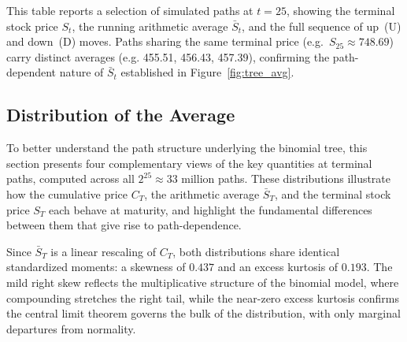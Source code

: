 \documentclass[hidelinks, 12pt, a4paper]{article}
\theoremstyle{definition}
\begin{document}
This table reports a selection of simulated paths at $t = 25$, showing the terminal
stock price $S_t$, the running arithmetic average $\bar{S}_t$, and the full sequence
of up~(U) and down~(D) moves. Paths sharing the same terminal price
(e.g.\ $S_{25} \approx 748.69$) carry distinct averages (e.g. 455.51, 456.43, 457.39),
confirming the path-dependent nature of $\bar{S}_t$ established in
Figure~\ref{fig:tree_avg}.

\subsection{Distribution of the Average}

To better understand the path structure underlying the binomial tree, this section
presents four complementary views of the key quantities at terminal paths, computed 
across all $2^{25} \approx 33$ million paths. These distributions illustrate how the 
cumulative price $C_T$, the arithmetic average $\bar{S}_T$, and the terminal 
stock price $S_T$ each behave at maturity, and highlight the fundamental differences 
between them that give rise to path-dependence.


Since $\bar{S}_T$ is a linear rescaling of $C_T$, both distributions 
share identical standardized moments: a skewness of $0.437$ and an excess kurtosis 
of $0.193$. The mild right skew reflects the multiplicative structure of the binomial 
model, where compounding stretches the right tail, while the near-zero excess kurtosis 
confirms the central limit theorem governs the bulk of the distribution, with only 
marginal departures from normality.
\end{document}
